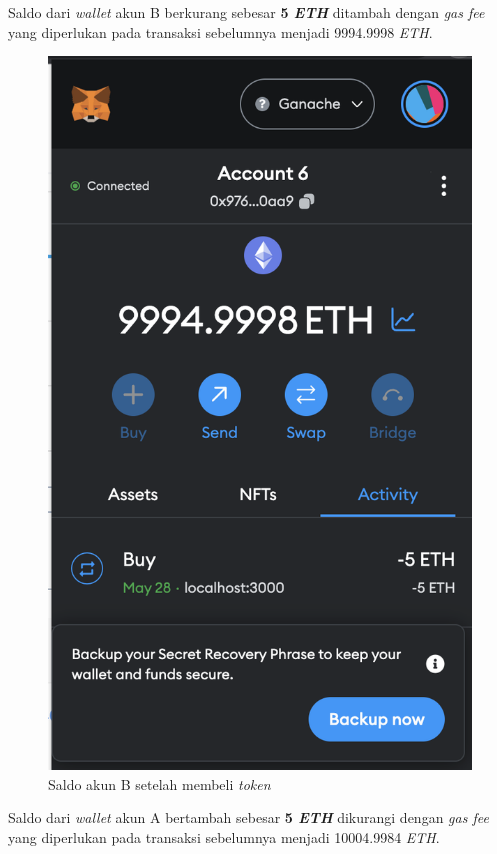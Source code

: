 \begin{itemize}
        Saldo dari \emph{wallet} akun B berkurang sebesar \textbf{5 \emph{ETH}} ditambah dengan \emph{gas fee} yang diperlukan pada transaksi sebelumnya menjadi 9994.9998 \emph{ETH}.
        \begin{figure} [H] \centering
            \includegraphics[scale=0.4]{gambar/img-test-share-buy-5.png}
            \caption{Saldo akun B setelah membeli \emph{token}}
            \label{fig:TestShareResultBuy3}
          \end{figure}
        Saldo dari \emph{wallet} akun A bertambah sebesar \textbf{5 \emph{ETH}} dikurangi dengan \emph{gas fee} yang diperlukan pada transaksi sebelumnya menjadi 10004.9984 \emph{ETH}. 

\end{itemize}

